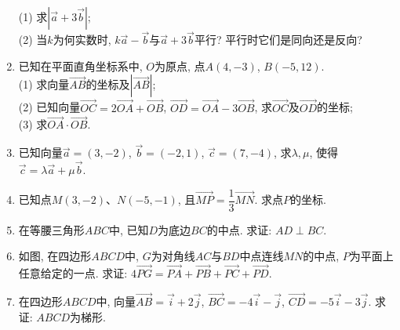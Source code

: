 \documentclass[10pt,a4paper]{article}
\begin{document}
\begin{enumerate}
(1) 求$|\overrightarrow a+3\overrightarrow b|$;\\
(2) 当$k$为何实数时, $k\overrightarrow a-\overrightarrow b$与$\overrightarrow a+3\overrightarrow b$平行? 平行时它们是同向还是反向?
\vspace*{3cm}
\item 已知在平面直角坐标系中, $O$为原点, 点$A(4, -3)$, $B(-5, 12)$.\\
(1) 求向量$\overrightarrow{AB}$的坐标及$|\overrightarrow{AB}|$;\\
(2) 已知向量$\overrightarrow{OC}=2\overrightarrow{OA}+\overrightarrow{OB}$, $\overrightarrow{OD}=\overrightarrow{OA}-3\overrightarrow{OB}$, 求$\overrightarrow{OC}$及$\overrightarrow{OD}$的坐标;\\
(3) 求$\overrightarrow{OA}\cdot\overrightarrow{OB}$.
\vspace*{3cm}
\item 已知向量$\overrightarrow a=(3, -2)$, $\overrightarrow b=(-2, 1)$, $\overrightarrow c=(7, -4)$, 求$\lambda,\mu$, 使得$\overrightarrow c=\lambda \overrightarrow a+\mu \overrightarrow b$.
\vspace*{3cm}
\item 已知点$M(3, -2)$、$N(-5, -1)$, 且$\overrightarrow{MP}=\dfrac 13\overrightarrow{MN}$. 求点$P$的坐标.
\vspace*{3cm}
\item 在等腰三角形$ABC$中, 已知$D$为底边$BC$的中点. 求证: $AD\perp BC$.
\vspace*{3cm}
\item 如图, 在四边形$ABCD$中, $G$为对角线$AC$与$BD$中点连线$MN$的中点, $P$为平面上任意给定的一点. 求证: $4\overrightarrow{PG}=\overrightarrow{PA}+\overrightarrow{PB}+\overrightarrow{PC}+\overrightarrow{PD}$.
\vspace*{3cm}
\item 在四边形$ABCD$中, 向量$\overrightarrow{AB}=\overrightarrow i+2\overrightarrow j$, $\overrightarrow{BC}=-4\overrightarrow i-\overrightarrow j$, $\overrightarrow{CD}=-5\overrightarrow i-3\overrightarrow j$. 求证: $ABCD$为梯形.
\begin{center}
\end{center}
\vspace*{3cm}
\end{enumerate}
\end{document}
